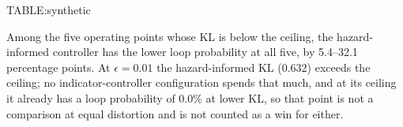 {{TABLE:synthetic}}

Among the five operating points whose KL is below the ceiling, the hazard-informed controller has the lower loop probability at all five, by 5.4--32.1 percentage points. At $\epsilon{=}0.01$ the hazard-informed KL (0.632) exceeds the ceiling; no indicator-controller configuration spends that much, and at its ceiling it already has a loop probability of 0.0\% at lower KL, so that point is not a comparison at equal distortion and is not counted as a win for either.

